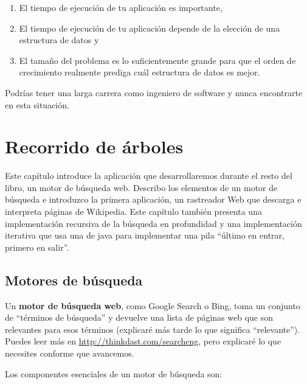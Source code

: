 \documentclass[12pt]{book}
\theoremstyle{exercise}
\begin{document}
\begin{enumerate}

\item
  El tiempo de ejecución de tu aplicación es importante,

\item
  El tiempo de ejecución de tu aplicación depende de la elección de una estructura
  de datos y

\item
  El tamaño del problema es lo suficientemente grande para que el orden de crecimiento
  realmente prediga cuál estructura de datos es mejor.

\end{enumerate}

Podrías tener una larga carrera como ingeniero de software y nunca encontrarte
en esta situación.


\chapter{Recorrido de árboles}
\label{cs-traversing-trees}

Este capítulo introduce la aplicación que desarrollaremos durante el
resto del libro, un motor de búsqueda web.
Describo los elementos de un motor de búsqueda e
introduzco la primera aplicación, un rastreador Web que descarga e interpreta
páginas de Wikipedia.  Este capítulo también presenta una implementación
recursiva de la búsqueda en profundidad y una implementación iterativa que usa
una  de java para implementar una pila ``último en entrar, primero en salir''.


\section{Motores de búsqueda}
\label{the-road-ahead}

Un \textbf{motor de búsqueda web}, como Google Search o Bing, toma un conjunto
de ``términos de búsqueda'' y devuelve una lista de páginas web que son relevantes
para esos términos (explicaré más tarde lo que significa ``relevante'').  Puedes leer
más en \url{http://thinkdast.com/searcheng}, pero explicaré lo que necesites conforme
que avancemos.


Los componentes esenciales de un motor de búsqueda son:
\end{document}
